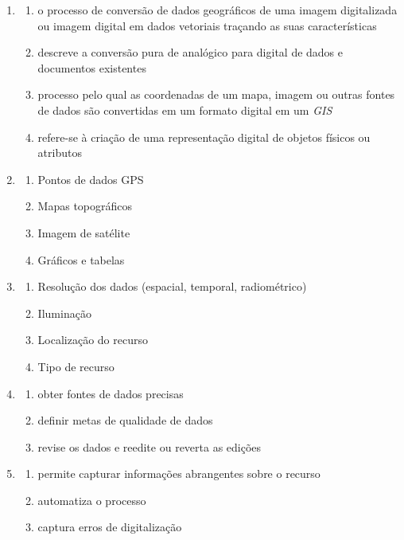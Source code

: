\documentclass[
  portuguese,
]{krantz}
\begin{document}
\begin{enumerate}
\def\labelenumi{\arabic{enumi}.}
\item
  \begin{enumerate}
  \def\labelenumii{\alph{enumii}.}
  \item
    o processo de conversão de dados geográficos de uma imagem digitalizada ou imagem digital em dados vetoriais traçando as suas características
  \item
    descreve a conversão pura de analógico para digital de dados e documentos existentes
  \item
    processo pelo qual as coordenadas de um mapa, imagem ou outras fontes de dados são convertidas em um formato digital em um \emph{GIS}
  \item
    refere-se à criação de uma representação digital de objetos físicos ou atributos
  \end{enumerate}
\item
  \begin{enumerate}
  \def\labelenumii{\alph{enumii}.}
  \item
    Pontos de dados GPS
  \item
    Mapas topográficos
  \item
    Imagem de satélite
  \item
    Gráficos e tabelas
  \end{enumerate}
\item
  \begin{enumerate}
  \def\labelenumii{\alph{enumii}.}
  \item
    Resolução dos dados (espacial, temporal, radiométrico)
  \item
    Iluminação
  \item
    Localização do recurso
  \item
    Tipo de recurso
  \end{enumerate}
\item
  \begin{enumerate}
  \def\labelenumii{\alph{enumii}.}
  \item
    obter fontes de dados precisas
  \item
    definir metas de qualidade de dados
  \item
    revise os dados e reedite ou reverta as edições
  \end{enumerate}
\item
  \begin{enumerate}
  \def\labelenumii{\alph{enumii}.}
  \item
    permite capturar informações abrangentes sobre o recurso
  \item
    automatiza o processo
  \item
    captura erros de digitalização
  \end{enumerate}
\end{enumerate}
\end{document}
